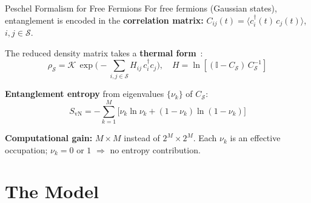 \documentclass[aspectratio=169,11pt]{beamer}
\begin{document}
\begin{frame}{Peschel Formalism for Free Fermions}
\small
    For \alert{free fermions} (Gaussian states), entanglement is encoded in the
    \textbf{correlation matrix:} $C_{ij}(t) = \langle c_i^\dagger(t)\, c_j(t) \rangle$, $i,j \in \mathcal{S}$.

    The reduced density matrix takes a \textbf{thermal form}~\cite{Peschel_2003}:
    \[
        \rho_{\mathcal{S}} = \mathcal{K}\,\exp\!\Big(-\sum_{i,j \in \mathcal{S}} H_{ij}\, c_i^\dagger c_j\Big), \quad H = \ln[(\mathbb{I} - C_{\mathcal{S}})\, C_{\mathcal{S}}^{-1}]
    \]

    \textbf{Entanglement entropy} from eigenvalues $\{\nu_k\}$ of $C_{\mathcal{S}}$:
    \[
        \boxed{S_{\mathrm{vN}} = -\sum_{k=1}^M \Big[\nu_k \ln \nu_k + (1-\nu_k)\ln(1-\nu_k)\Big]}
    \]

    \textbf{Computational gain:} $M \times M$ instead of $2^M \times 2^M$.
    Each $\nu_k$ is an effective occupation; $\nu_k = 0$ or $1$ $\Rightarrow$ no entropy contribution.
\end{frame}

\section{The Model}
\end{document}
